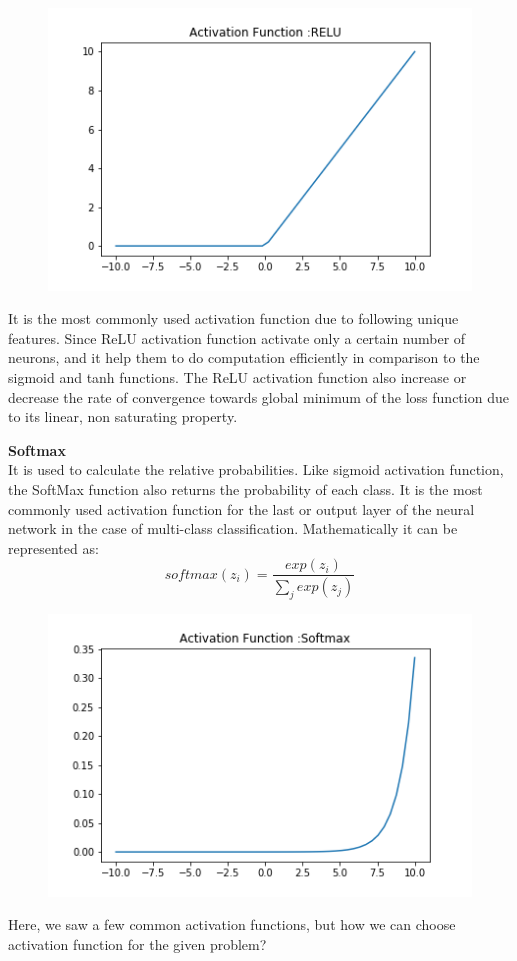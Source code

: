 \begin{figure}[H]
    \centering
    \includegraphics{Figure/RELU.png}
    \label{fig:my_label}
\end{figure}


It is the most commonly used activation  function due to following unique features. Since ReLU activation function activate only a certain number of neurons, and it help them to do computation efficiently  in comparison to the sigmoid and tanh functions.\cite{https://doi.org/10.48550/arxiv.1811.03378} The ReLU activation function also increase or decrease the rate of convergence towards global minimum of the loss function due to its linear, non saturating property\cite{https://doi.org/10.48550/arxiv.1803.08375}.

\textbf{Softmax}\\
It is used to calculate the relative probabilities. Like sigmoid activation function, the SoftMax function also returns the probability of each class.
It is the most commonly used activation function for the last or output layer of the neural network in the case of multi-class classification\cite{https://doi.org/10.48550/arxiv.1811.03378}. 
Mathematically it can be represented as:
\begin{equation}
    softmax(z_i) = \frac{exp(z_i)}{\sum_j exp(z_j)}
\end{equation}
\begin{figure}[H]
    \centering
    \includegraphics{Figure/softmax.png}
    \label{fig:my_label}
\end{figure}
Here, we saw a few common activation functions, but how we can choose activation function for the given problem? 

